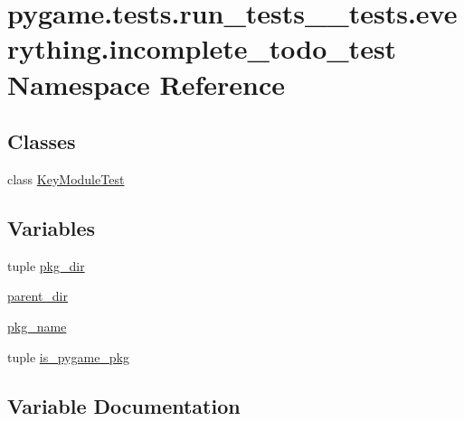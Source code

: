 \hypertarget{namespacepygame_1_1tests_1_1run__tests____tests_1_1everything_1_1incomplete__todo__test}{}\section{pygame.\+tests.\+run\+\_\+tests\+\_\+\+\_\+tests.\+everything.\+incomplete\+\_\+todo\+\_\+test Namespace Reference}
\label{namespacepygame_1_1tests_1_1run__tests____tests_1_1everything_1_1incomplete__todo__test}
\subsection*{Classes}
\begin{DoxyCompactItemize}
\item 
class \hyperlink{classpygame_1_1tests_1_1run__tests____tests_1_1everything_1_1incomplete__todo__test_1_1_key_module_test}{Key\+Module\+Test}
\end{DoxyCompactItemize}
\subsection*{Variables}
\begin{DoxyCompactItemize}
\item 
tuple \hyperlink{namespacepygame_1_1tests_1_1run__tests____tests_1_1everything_1_1incomplete__todo__test_a30800c8c9b7d4df59e858dc9e8affda9}{pkg\+\_\+dir}
\item 
\hyperlink{namespacepygame_1_1tests_1_1run__tests____tests_1_1everything_1_1incomplete__todo__test_a9d59f6ff00afbf937c201de880a103a7}{parent\+\_\+dir}
\item 
\hyperlink{namespacepygame_1_1tests_1_1run__tests____tests_1_1everything_1_1incomplete__todo__test_aaf33d1ab9213e96ef484d0f6408e248a}{pkg\+\_\+name}
\item 
tuple \hyperlink{namespacepygame_1_1tests_1_1run__tests____tests_1_1everything_1_1incomplete__todo__test_a2cb1d68e997e370de79fdbdaae257141}{is\+\_\+pygame\+\_\+pkg}
\end{DoxyCompactItemize}


\subsection{Variable Documentation}
\mbox{\label{namespacepygame_1_1tests_1_1run__tests____tests_1_1everything_1_1incomplete__todo__test_a2cb1d68e997e370de79fdbdaae257141}} 
